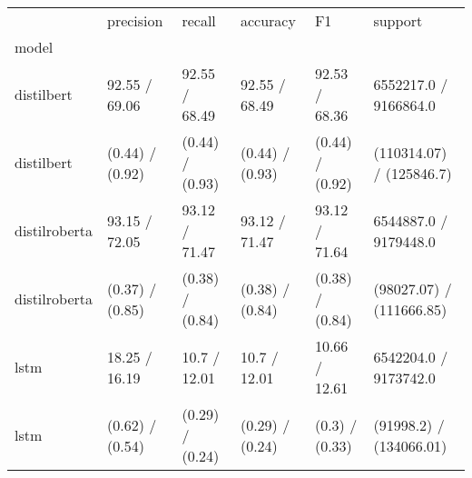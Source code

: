 \begin{tabular}{llllll}
\toprule
{} &        precision &           recall &         accuracy &               F1 &                   support \\
model         &                  &                  &                  &                  &                           \\
\midrule
distilbert    &    92.55 / 69.06 &    92.55 / 68.49 &    92.55 / 68.49 &    92.53 / 68.36 &     6552217.0 / 9166864.0 \\
distilbert    &  (0.44) / (0.92) &  (0.44) / (0.93) &  (0.44) / (0.93) &  (0.44) / (0.92) &  (110314.07) / (125846.7) \\
distilroberta &    93.15 / 72.05 &    93.12 / 71.47 &    93.12 / 71.47 &    93.12 / 71.64 &     6544887.0 / 9179448.0 \\
distilroberta &  (0.37) / (0.85) &  (0.38) / (0.84) &  (0.38) / (0.84) &  (0.38) / (0.84) &  (98027.07) / (111666.85) \\
lstm          &    18.25 / 16.19 &     10.7 / 12.01 &     10.7 / 12.01 &    10.66 / 12.61 &     6542204.0 / 9173742.0 \\
lstm          &  (0.62) / (0.54) &  (0.29) / (0.24) &  (0.29) / (0.24) &   (0.3) / (0.33) &   (91998.2) / (134066.01) \\
\bottomrule
\end{tabular}
